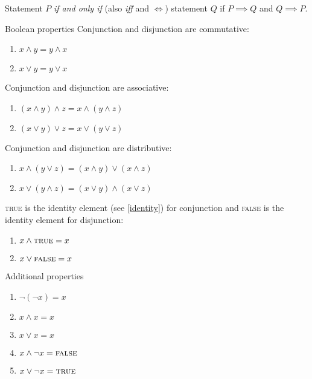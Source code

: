 \documentclass[12pt]{article}
\begin{document}
\begin{defn}\label{iff}
    Statement $P$ \emph{if and only if} (also \emph{iff} and $\iff$) statement $Q$ if $P \implies Q$ and $Q \implies P$.
\end{defn}

\begin{thm}{Boolean properties}\label{boolean-algebraic-properties}\proofbreak
    Conjunction and disjunction are commutative:
    \begin{enumerate}
        \item $x \land y = y \land x$
        \item $x \lor y = y \lor x$
    \end{enumerate}

    Conjunction and disjunction are associative:
    \begin{enumerate}
        \item $(x \land y) \land z = x \land (y \land z)$
        \item $(x \lor y) \lor z = x \lor (y \lor z)$
    \end{enumerate}

    Conjunction and disjunction are distributive:
    \begin{enumerate}
        \item $x \land (y \lor z) = (x \land y) \lor (x \land z)$
        \item $x \lor (y \land z) = (x \lor y) \land (x \lor z)$
    \end{enumerate}

    \textup{\textsc{true}} is the identity element (see \ref{identity}) for conjunction and \textup{\textsc{false}} is the identity element for disjunction:
    \begin{enumerate}
        \item $x \land \textup{\textsc{true}} = x$
        \item $x \lor \textup{\textsc{false}} = x$
    \end{enumerate}
\end{thm}

\begin{thm}{Additional properties}\label{additional-boolean-properties}\proofbreak
    \begin{enumerate}
        \item $\neg(\neg x) = x$
        \item $x \land x = x$
        \item $x \lor x = x$
        \item $x \land \neg x = \textup{\textsc{false}}$
        \item $x \lor \neg x = \textup{\textsc{true}}$
    \end{enumerate}
\end{thm}
\end{document}
